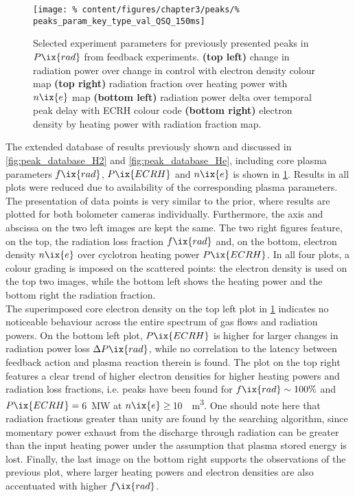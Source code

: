 %
        \begin{figure}[t]%
            \centering%
            \texttt{[image: \%
                content/figures/chapter3/peaks/\%
                peaks\_param\_key\_type\_val\_QSQ\_150ms]}%
            \caption{Selected experiment parameters for previously presented peaks in $P\ix{rad}$ from feedback experiments. \textbf{(top left)} change in radiation power over change in control with electron density colour map \textbf{(top right)} radiation fraction over heating power with $n\ix{e}$ map \textbf{(bottom left)} radiation power delta over temporal peak delay with ECRH colour code \textbf{(bottom right)} electron density by heating power with radiation fraction map.}\label{fig:peak_parameters_QSQ}%
        \end{figure}%
%
        The extended database of results previously shown and discussed in \cref{fig:peak_database_H2} and \ref{fig:peak_database_He}, including core plasma parameters $f\ix{rad}$, $P\ix{ECRH}$ and $n\ix{e}$ is shown in \cref{fig:peak_parameters_QSQ}. Results in all plots were reduced due to availability of the corresponding plasma parameters. The presentation of data points is very similar to the prior, where results are plotted for both bolometer cameras individually. Furthermore, the axis and abscissa on the two left images are kept the same. The two right figures feature, on the top, the radiation loss fraction $f\ix{rad}$ and, on the bottom, electron density $n\ix{e}$ over cyclotron heating power $P\ix{ECRH}$. In all four plots, a colour grading is imposed on the scattered points: the electron density is used on the top two images, while the bottom left shows the heating power and the bottom right the radiation fraction.\\%
        The superimposed core electron density on the top left plot in \cref{fig:peak_parameters_QSQ} indicates no noticeable behaviour across the entire spectrum of gas flows and radiation powers. On the bottom left plot, $P\ix{ECRH}$ is higher for larger changes in radiation power loss $\Delta P\ix{rad}$, while no correlation to the latency between feedback action and plasma reaction therein is found. The plot on the top right features a clear trend of higher electron densities for higher heating powers and radiation loss fractions, i.e. peaks have been found for $f\ix{rad}\sim100\%$ and $P\ix{ECRH}=\,$\SI{6}{\mega\watt} at $n\ix{e}\ge\,$\SI{10}{\per\cubic\meter}. One should note here that radiation fractions greater than unity are found by the searching algorithm, since momentary power exhaust from the discharge through radiation can be greater than the input heating power under the assumption that plasma stored energy is lost. Finally, the last image on the bottom right supports the observations of the previous plot, where larger heating powers and electron densities are also accentuated with higher $f\ix{rad}$.\\%

